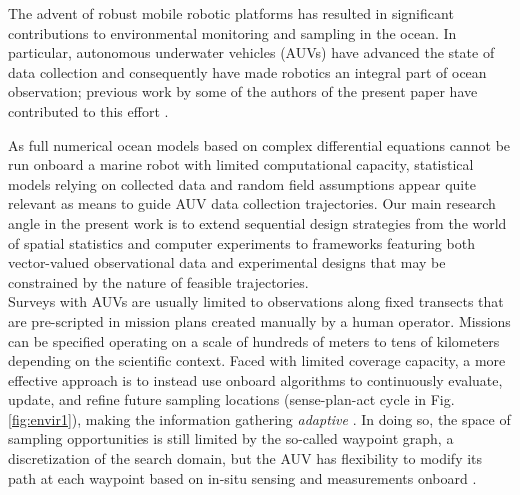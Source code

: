 \documentclass[aoas]{imsart}
\begin{document}
%

%
The advent of robust mobile robotic platforms \citep{Bellingham07} has
resulted in significant contributions to environmental monitoring and
sampling in the ocean. In particular, autonomous underwater vehicles (AUVs) have advanced the state of data collection and consequently have made robotics an integral part of ocean observation; %
previous work by some of the authors of the present paper have contributed to this effort \citep{das11b,Das2015,fossuminformation,fossum18b}. 


As full numerical ocean models based on complex differential equations cannot be run onboard a marine robot with limited computational capacity, statistical models relying on collected data and random field assumptions appear quite relevant as means to guide AUV data collection trajectories. Our main research angle in the present work is to extend sequential design strategies from the world of spatial statistics and computer experiments to frameworks featuring both vector-valued observational data and experimental designs that may be constrained by the nature of feasible trajectories.      
\\

Surveys with AUVs are usually limited to observations along fixed
transects that are pre-scripted in mission plans created manually by a
human operator. Missions can be specified operating on a scale of
hundreds of meters to tens of kilometers depending on the scientific
context. Faced with limited coverage capacity, a more effective
approach is to instead use onboard algorithms to continuously
evaluate, update, and refine future sampling locations (sense-plan-act
cycle in Fig. \ref{fig:envir1}), making the information gathering
\emph{adaptive} \citep{das11b,Das2015,fossuminformation,fossum18b}.
In doing so, the space of sampling opportunities is still limited by
the so-called waypoint graph, a discretization of the search domain, but the AUV has flexibility to modify its path at each waypoint based on in-situ sensing and measurements onboard \citep{py10,Rajan12,Rajan12b}.\\
\end{document}

